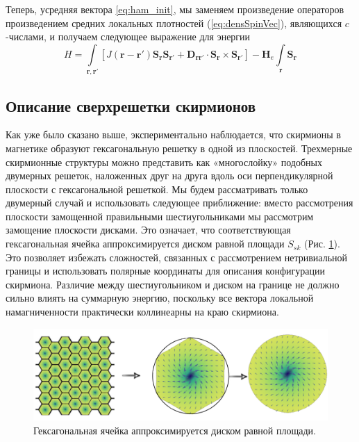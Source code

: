 \documentclass[a4paper,article,14pt]{extarticle}
\begin{document}
Теперь, усредняя вектора \eqref{eq:ham_init}, мы заменяем произведение операторов произведением средних локальных плотностей (\ref{eq:densSpinVec}), являющихся $c$-числами, и получаем следующее выражение для энергии
\begin{equation}
\label{eq:ham}	
H = \int\limits_{\mathbf{r}, \mathbf{r}'} \left[ J\left( \mathbf{r} - \mathbf{r}' \right)\mathbf{S}_{\mathbf{r}} \mathbf{S}_{\mathbf{r}'} + {{\mathbf{D}}_{\mathbf{r} \mathbf{r}'}} \cdot \mathbf{S}_{\mathbf{r}} \times \mathbf{S}_{\mathbf{r}'} \right] -  \mathbf{H}_e  \int\limits_{\mathbf{r}}\mathbf{S}_{\mathbf{r}}
\end{equation}

\subsection{Описание сверхрешетки скирмионов}
Как уже было сказано выше, экспериментально наблюдается, что скирмионы в магнетике образуют гексагональную решетку в одной из плоскостей. \cite{muhlbauer, yu} Трехмерные скирмионные структуры можно представить как «многослойку» подобных двумерных решеток, наложенных друг на друга вдоль оси перпендикулярной плоскости с гексагональной решеткой. Мы будем рассматривать только двумерный случай и использовать следующее приближение: вместо рассмотрения плоскости замощенной правильными шестиугольниками мы рассмотрим замощение плоскости дисками. Это означает, что соответствующая гексагональная ячейка аппроксимируется диском равной площади $S_{sk}$ (Рис. \ref{pic:approxHexagone}). Это позволяет избежать сложностей, связанных с рассмотрением нетривиальной границы и использовать полярные координаты для описания конфигурации скирмиона. Различие между шестиугольником и диском на границе не должно сильно влиять на суммарную энергию, поскольку все вектора локальной намагниченности практически коллинеарны на краю скирмиона.

\begin{figure}[h]
\centering
\includegraphics[width=0.5\paperwidth]{images/approx.png}
\caption{Гексагональная ячейка аппроксимируется диском равной площади.}
\label{pic:approxHexagone}
\end{figure}
\end{document}
